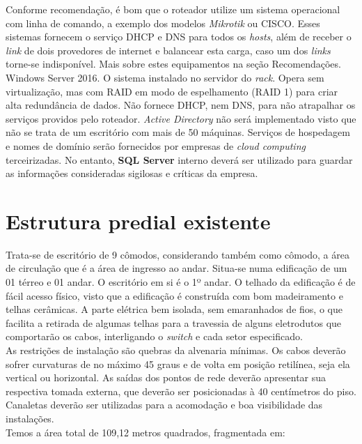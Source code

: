 \documentclass[	DIV=calc,%
							paper=a4,%
							fontsize=12pt,%
							onecolumn]{scrartcl}	 					%
\begin{document}
Conforme recomendação, é bom que o roteador utilize um sistema operacional com linha de comando, a exemplo dos modelos \textit{Mikrotik} ou CISCO. Esses sistemas fornecem o serviço DHCP e DNS para todos os \textit{hosts}, além de receber o \textit{link} de dois provedores de internet e balancear esta carga, caso um dos \textit{links} torne-se indisponível. Mais sobre estes equipamentos na seção {Recomendações}.
\\

Windows Server 2016. O sistema instalado no servidor do \textit{rack}. Opera sem virtualização, mas com RAID em modo de espelhamento (RAID 1) para criar alta redundância de dados. Não fornece DHCP, nem DNS, para não atrapalhar os serviços providos pelo roteador. \textit{Active Directory }não será implementado visto que não se trata de um escritório com mais de 50 máquinas. Serviços de hospedagem e nomes de domínio serão fornecidos por empresas de \textit{cloud computing} terceirizadas. No entanto, \textbf{SQL Server} interno deverá ser utilizado para guardar as informações consideradas sigilosas e críticas da empresa.

\pagebreak
\section{Estrutura predial existente}

Trata-se de escritório de 9 cômodos, considerando também como cômodo, a área de circulação que é a área de ingresso ao andar. Situa-se numa edificação de um 01 térreo e 01 andar. O escritório em si é o 1º andar. O telhado da edificação é de fácil acesso físico, visto que a edificação é construída com bom madeiramento e telhas cerâmicas. A parte elétrica bem isolada, sem emaranhados de fios, o que facilita a retirada de algumas telhas para a travessia de alguns eletrodutos que comportarão os cabos, interligando o \textit{switch} e cada setor especificado. \\

As restrições de instalação são quebras da alvenaria mínimas. Os cabos deverão sofrer curvaturas de no máximo 45 graus e de volta em posição retilínea, seja ela vertical ou horizontal. As saídas dos pontos de rede deverão apresentar sua respectiva tomada externa, que deverão ser posicionadas à 40 centímetros do piso. Canaletas deverão ser utilizadas para a acomodação e boa visibilidade das instalações.
\\

Temos a área total de 109,12 metros quadrados, fragmentada em:
\end{document}
